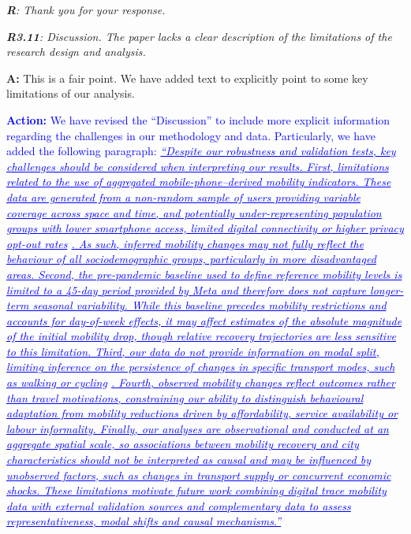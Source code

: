 \documentclass[12pt,a4paper,oneside, reqno]{amsart}
\begin{document}
\setlength{\leftskip}{1cm} \textit{\textbf{R}: Thank you for your response.}

\setlength{\leftskip}{0cm} \textit{\textbf{R3.11}: Discussion. The paper lacks a clear description of the limitations of the research design and analysis.}

\setlength{\leftskip}{1cm}\textbf{A:} This is a fair point. We have added text to explicitly point to some key limitations of our analysis.

\textcolor{blue}{
\textbf{Action:} We have revised the ``Discussion'' to include more explicit information regarding the challenges in our methodology and data. Particularly, we have added the following paragraph: \textit{\ul{``Despite our robustness and validation tests, key challenges should be considered when interpreting our results. First, limitations related to the use of aggregated mobile-phone–derived mobility indicators. These data are generated from a non-random sample of users providing variable coverage across space and time, and potentially under-representing population groups with lower smartphone access, limited digital connectivity or higher privacy opt-out rates} \parencite{cabrera2025bias}\ul{. As such, inferred mobility changes may not fully reflect the behaviour of all sociodemographic groups, particularly in more disadvantaged areas. Second, the pre-pandemic baseline used to define reference mobility levels is limited to a 45-day period provided by Meta and therefore does not capture longer-term seasonal variability. While this baseline precedes mobility restrictions and accounts for day-of-week effects, it may affect estimates of the absolute magnitude of the initial mobility drop, though relative recovery trajectories are less sensitive to this limitation. Third, our data do not provide information on modal split, limiting inference on the persistence of changes in specific transport modes, such as walking or cycling} \parencite{zhang2023impacts}\ul{. Fourth, observed mobility changes reflect outcomes rather than travel motivations, constraining our ability to distinguish behavioural adaptation from mobility reductions driven by affordability, service availability or labour informality. Finally, our analyses are observational and conducted at an aggregate spatial scale, so associations between mobility recovery and city characteristics should not be interpreted as causal and may be influenced by unobserved factors, such as changes in transport supply or concurrent economic shocks. These limitations motivate future work combining digital trace mobility data with external validation sources and complementary data to assess representativeness, modal shifts and causal mechanisms.''}}
}
\end{document}
